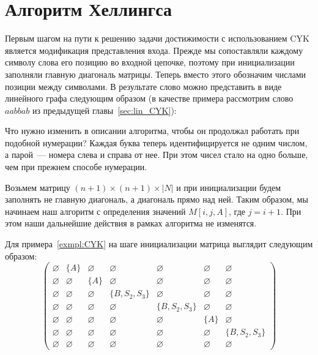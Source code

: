 \section{Алгоритм Хеллингса}
\label{sec:CFPQ_Hellings}

Первым шагом на пути к решению задачи достижимости с использованием CYK является модификация представления входа.
Прежде мы сопоставляли каждому символу слова его позицию во входной цепочке, поэтому при инициализации заполняли главную диагональ матрицы.
Теперь вместо этого обозначим числами позиции между символами.
В результате слово можно представить в виде линейного графа следующим образом (в качестве примера рассмотрим слово $a a b b a b$ из предыдущей главы~\ref{sec:lin_CYK}):
\begin{center}
    
\end{center}

Что нужно изменить в описании алгоритма, чтобы он продолжал работать при подобной нумерации?
Каждая буква теперь идентифицируется не одним числом, а парой~--- номера слева и справа от нее.
При этом чисел стало на одно больше, чем при прежнем способе нумерации.

Возьмем матрицу $(n + 1) \times (n + 1) \times  |N|$ и при инициализации будем заполнять не главную диагональ, а диагональ прямо над ней.
Таким образом, мы начинаем наш алгоритм с определения значений $M[i, j, A]$, где  $j = i + 1$.
При этом наши дальнейшие действия в рамках алгоритма не изменятся.

Для примера~\ref{exmpl:CYK} на шаге инициализации матрица выглядит следующим образом:
\[
    \begin{pmatrix}
        \varnothing & \{A\}       & \varnothing & \varnothing     & \varnothing     & \varnothing & \varnothing     \\
        \varnothing & \varnothing & \{A\}       & \varnothing     & \varnothing     & \varnothing & \varnothing     \\
        \varnothing & \varnothing & \varnothing & \{B, S_2, S_3\} & \varnothing     & \varnothing & \varnothing     \\
        \varnothing & \varnothing & \varnothing & \varnothing     & \{B, S_2, S_3\} & \varnothing & \varnothing     \\
        \varnothing & \varnothing & \varnothing & \varnothing     & \varnothing     & \{A\}       & \varnothing     \\
        \varnothing & \varnothing & \varnothing & \varnothing     & \varnothing     & \varnothing & \{B, S_2, S_3\} \\
        \varnothing & \varnothing & \varnothing & \varnothing     & \varnothing     & \varnothing & \varnothing
    \end{pmatrix}
\]

